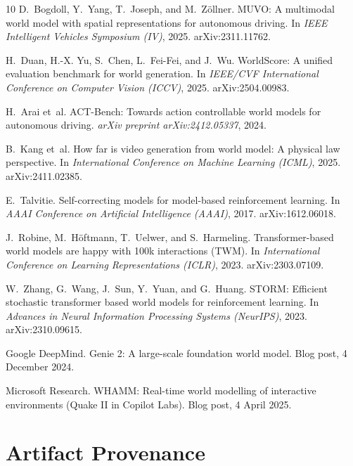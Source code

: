 \documentclass[11pt]{article}
\begin{document}
\begin{thebibliography}{10}
D.~Bogdoll, Y.~Yang, T.~Joseph, and M.~Z\"ollner.
\newblock MUVO: A multimodal world model with spatial representations for autonomous driving.
\newblock In \emph{IEEE Intelligent Vehicles Symposium (IV)}, 2025. arXiv:2311.11762.

H.~Duan, H.-X. Yu, S.~Chen, L.~Fei-Fei, and J.~Wu.
\newblock WorldScore: A unified evaluation benchmark for world generation.
\newblock In \emph{IEEE/CVF International Conference on Computer Vision (ICCV)}, 2025. arXiv:2504.00983.

H.~Arai et~al.
\newblock ACT-Bench: Towards action controllable world models for autonomous driving.
\newblock \emph{arXiv preprint arXiv:2412.05337}, 2024.

B.~Kang et~al.
\newblock How far is video generation from world model: A physical law perspective.
\newblock In \emph{International Conference on Machine Learning (ICML)}, 2025. arXiv:2411.02385.

E.~Talvitie.
\newblock Self-correcting models for model-based reinforcement learning.
\newblock In \emph{AAAI Conference on Artificial Intelligence (AAAI)}, 2017. arXiv:1612.06018.

J.~Robine, M.~H\"oftmann, T.~Uelwer, and S.~Harmeling.
\newblock Transformer-based world models are happy with 100k interactions (TWM).
\newblock In \emph{International Conference on Learning Representations (ICLR)}, 2023. arXiv:2303.07109.

W.~Zhang, G.~Wang, J.~Sun, Y.~Yuan, and G.~Huang.
\newblock STORM: Efficient stochastic transformer based world models for reinforcement learning.
\newblock In \emph{Advances in Neural Information Processing Systems (NeurIPS)}, 2023. arXiv:2310.09615.

Google DeepMind.
\newblock Genie 2: A large-scale foundation world model.
\newblock Blog post, 4 December 2024.

Microsoft Research.
\newblock WHAMM: Real-time world modelling of interactive environments (Quake II in Copilot Labs).
\newblock Blog post, 4 April 2025.

\end{thebibliography}

\appendix
\section{Artifact Provenance}
\label{app:provenance}
\end{document}
